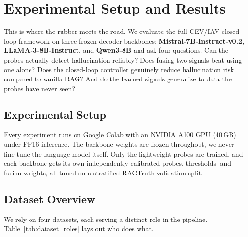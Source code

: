 \chapter{Experimental Setup and Results}
\label{ch:results}

This is where the rubber meets the road. We evaluate the full CEV/IAV closed-loop framework on three frozen decoder backbones: \textbf{Mistral-7B-Instruct-v0.2}, \textbf{LLaMA-3-8B-Instruct}, and \textbf{Qwen3-8B} and ask four questions. Can the probes actually detect hallucination reliably? Does fusing two signals beat using one alone? Does the closed-loop controller genuinely reduce hallucination risk compared to vanilla RAG? And do the learned signals generalize to data the probes have never seen?

\section{Experimental Setup}
\label{sec:experimental_setup}

Every experiment runs on Google Colab with an NVIDIA A100 GPU (40\,GB) under FP16 inference. The backbone weights are frozen throughout, we never fine-tune the language model itself. Only the lightweight probes are trained, and each backbone gets its own independently calibrated probes, thresholds, and fusion weights, all tuned on a stratified RAGTruth validation split.

\section{Dataset Overview}
\label{sec:dataset_overview}

We rely on four datasets, each serving a distinct role in the pipeline. Table~\ref{tab:dataset_roles} lays out who does what.

